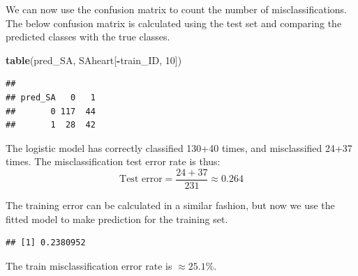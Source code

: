 \documentclass[10pt,ignorenonframetext,]{beamer}
\newenvironment{Shaded}{\begin{snugshade}}{\end{snugshade}}
\newcommand{\KeywordTok}[1]{\textcolor[rgb]{0.13,0.29,0.53}{\textbf{#1}}}
\newcommand{\DecValTok}[1]{\textcolor[rgb]{0.00,0.00,0.81}{#1}}
\newcommand{\FloatTok}[1]{\textcolor[rgb]{0.00,0.00,0.81}{#1}}
\newcommand{\StringTok}[1]{\textcolor[rgb]{0.31,0.60,0.02}{#1}}
\newcommand{\OperatorTok}[1]{\textcolor[rgb]{0.81,0.36,0.00}{\textbf{#1}}}
\newcommand{\NormalTok}[1]{#1}
\begin{document}
\begin{frame}[fragile]

We can now use the confusion matrix to count the number of
misclassifications. The below confusion matrix is calculated using the
test set and comparing the predicted classes with the true classes.

\begin{Shaded}
\begin{Highlighting}[]
\KeywordTok{table}\NormalTok{(pred_SA, SAheart[}\OperatorTok{-}\NormalTok{train_ID, }\DecValTok{10}\NormalTok{])}
\end{Highlighting}
\end{Shaded}

\begin{verbatim}
##        
## pred_SA   0   1
##       0 117  44
##       1  28  42
\end{verbatim}

The logistic model has correctly classified 130+40 times, and
misclassified 24+37 times. The misclassification test error rate is
thus: \[\text{Test error} = \frac{24+37}{231} \approx 0.264\]

\end{frame}

\begin{frame}[fragile]

The training error can be calculated in a similar fashion, but now we
use the fitted model to make prediction for the training set.

\begin{Shaded}
\end{Shaded}

\begin{verbatim}
## [1] 0.2380952
\end{verbatim}

The train misclassification error rate is \(\approx 25.1\%\).

\end{frame}
\end{document}
